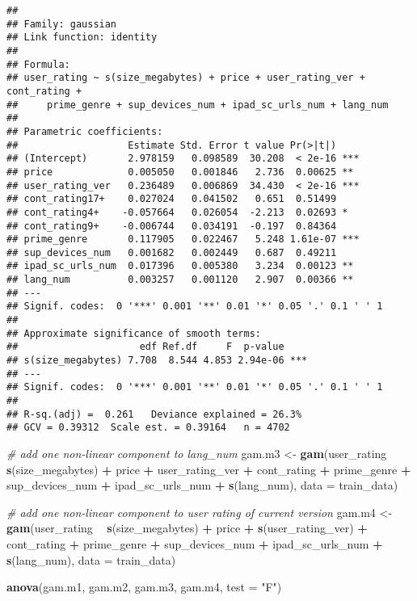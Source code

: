 \documentclass[]{article}
\newenvironment{Shaded}{\begin{snugshade}}{\end{snugshade}}
\newcommand{\KeywordTok}[1]{\textcolor[rgb]{0.13,0.29,0.53}{\textbf{#1}}}
\newcommand{\DataTypeTok}[1]{\textcolor[rgb]{0.13,0.29,0.53}{#1}}
\newcommand{\StringTok}[1]{\textcolor[rgb]{0.31,0.60,0.02}{#1}}
\newcommand{\CommentTok}[1]{\textcolor[rgb]{0.56,0.35,0.01}{\textit{#1}}}
\newcommand{\OperatorTok}[1]{\textcolor[rgb]{0.81,0.36,0.00}{\textbf{#1}}}
\newcommand{\NormalTok}[1]{#1}
\begin{document}
\begin{verbatim}
## 
## Family: gaussian 
## Link function: identity 
## 
## Formula:
## user_rating ~ s(size_megabytes) + price + user_rating_ver + cont_rating + 
##     prime_genre + sup_devices_num + ipad_sc_urls_num + lang_num
## 
## Parametric coefficients:
##                   Estimate Std. Error t value Pr(>|t|)    
## (Intercept)       2.978159   0.098589  30.208  < 2e-16 ***
## price             0.005050   0.001846   2.736  0.00625 ** 
## user_rating_ver   0.236489   0.006869  34.430  < 2e-16 ***
## cont_rating17+    0.027024   0.041502   0.651  0.51499    
## cont_rating4+    -0.057664   0.026054  -2.213  0.02693 *  
## cont_rating9+    -0.006744   0.034191  -0.197  0.84364    
## prime_genre       0.117905   0.022467   5.248 1.61e-07 ***
## sup_devices_num   0.001682   0.002449   0.687  0.49211    
## ipad_sc_urls_num  0.017396   0.005380   3.234  0.00123 ** 
## lang_num          0.003257   0.001120   2.907  0.00366 ** 
## ---
## Signif. codes:  0 '***' 0.001 '**' 0.01 '*' 0.05 '.' 0.1 ' ' 1
## 
## Approximate significance of smooth terms:
##                     edf Ref.df     F  p-value    
## s(size_megabytes) 7.708  8.544 4.853 2.94e-06 ***
## ---
## Signif. codes:  0 '***' 0.001 '**' 0.01 '*' 0.05 '.' 0.1 ' ' 1
## 
## R-sq.(adj) =  0.261   Deviance explained = 26.3%
## GCV = 0.39312  Scale est. = 0.39164   n = 4702
\end{verbatim}

\begin{Shaded}
\begin{Highlighting}[]
\CommentTok{#  add one non-linear component to lang_num}
\NormalTok{gam.m3 <-}\StringTok{ }\KeywordTok{gam}\NormalTok{(user_rating }\OperatorTok{~}\StringTok{ }\KeywordTok{s}\NormalTok{(size_megabytes) }\OperatorTok{+}\StringTok{ }\NormalTok{price }\OperatorTok{+}\StringTok{ }
\StringTok{                }\NormalTok{user_rating_ver }\OperatorTok{+}\StringTok{ }\NormalTok{cont_rating }\OperatorTok{+}\StringTok{ }\NormalTok{prime_genre }\OperatorTok{+}\StringTok{ }\NormalTok{sup_devices_num }\OperatorTok{+}
\StringTok{                }\NormalTok{ipad_sc_urls_num }\OperatorTok{+}\StringTok{ }\KeywordTok{s}\NormalTok{(lang_num), }\DataTypeTok{data =}\NormalTok{ train_data)}

\CommentTok{# add one non-linear component to user rating of current version}
\NormalTok{gam.m4 <-}\StringTok{ }\KeywordTok{gam}\NormalTok{(user_rating }\OperatorTok{~}\StringTok{ }\KeywordTok{s}\NormalTok{(size_megabytes) }\OperatorTok{+}\StringTok{ }\NormalTok{price }\OperatorTok{+}\StringTok{ }
\StringTok{                }\KeywordTok{s}\NormalTok{(user_rating_ver) }\OperatorTok{+}\StringTok{ }\NormalTok{cont_rating }\OperatorTok{+}\StringTok{ }\NormalTok{prime_genre }\OperatorTok{+}\StringTok{ }\NormalTok{sup_devices_num }\OperatorTok{+}
\StringTok{                }\NormalTok{ipad_sc_urls_num }\OperatorTok{+}\StringTok{ }\KeywordTok{s}\NormalTok{(lang_num), }\DataTypeTok{data =}\NormalTok{ train_data)}

\KeywordTok{anova}\NormalTok{(gam.m1, gam.m2, gam.m3, gam.m4, }\DataTypeTok{test =} \StringTok{"F"}\NormalTok{)}
\end{Highlighting}
\end{Shaded}
\end{document}

